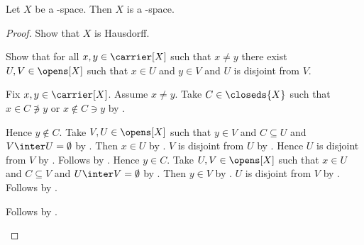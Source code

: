 \begin{theorem}\label{teethree_space_is_teetwo_space}
    Let $X$ be a \teethree-space.
    Then $X$ is a \teetwo-space.
\end{theorem}
\begin{proof}
    Show that $X$ is Hausdorff.
    \begin{subproof}
        Show that for all $x,y\in\carrier[X]$ such that $x\neq y$
            there exist $U,V\in\opens[X]$ such that $x\in U$ and
            $y\in V$ and $U$ is disjoint from $V$.
        \begin{subproof}
            Fix $x,y\in\carrier[X]$.
            Assume $x\neq y$.
            Take $C\in\closeds{X}$ such that
                $x\in C\not\ni y$ or $x\notin C\ni y$
                by .
            \begin{byCase}
                Hence $y\notin C$.
                Take $V,U\in\opens[X]$ such that $y\in V$ and
                    $C\subseteq U$ and $V\inter U=\emptyset$
                    by .
                Then $x\in U$ by .
                $V$ is disjoint from $U$
                    by .
                Hence $U$ is disjoint from $V$
                    by .
                Follows by \auto.
                Hence $y\in C$.
                Take $U,V\in\opens[X]$ such that $x\in U$ and
                    $C\subseteq V$ and $U\inter V=\emptyset$
                    by .
                Then $y\in V$ by .
                $U$ is disjoint from $V$
                    by .
                Follows by \auto.
            \end{byCase}
        \end{subproof}
        Follows by .
    \end{subproof}
\end{proof}

